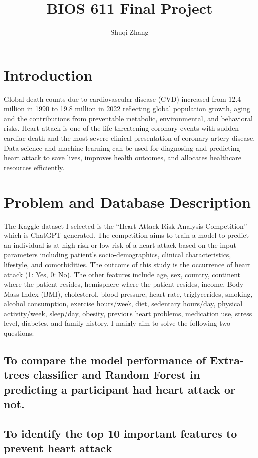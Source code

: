 \documentclass{article}
\title{BIOS 611 Final Project}
\author{Shuqi Zhang}
\begin{document}
\maketitle


\section{Introduction}
Global death counts due to cardiovascular disease (CVD) increased from 12.4 million in 1990 to 19.8 million in 2022 reflecting global population growth, aging and the contributions from preventable metabolic, environmental, and behavioral risks.  Heart attack is one of the life-threatening coronary events with sudden cardiac death and the most severe clinical presentation of coronary artery disease. Data science and machine learning can be used for diagnosing and predicting heart attack to save lives, improves health outcomes, and allocates healthcare resources efficiently. 

\section{Problem and Database Description}
The Kaggle dataset I selected is the “Heart Attack Risk Analysis Competition” which is ChatGPT generated. The competition aims to train a model to predict an individual is at high risk or low risk of a heart attack based on the input parameters including patient’s socio-demographics, clinical characteristics, lifestyle, and comorbidities. The outcome of this study is the occurrence of heart attack (1: Yes, 0: No). The other features include age, sex, country, continent where the patient resides, hemisphere where the patient resides, income, Body Mass Index (BMI), cholesterol, blood pressure, heart rate, triglycerides, smoking, alcohol consumption, exercise hours/week, diet, sedentary hours/day, physical activity/week, sleep/day, obesity, previous heart problems, medication use, stress level, diabetes, and family history. I mainly aim to solve the following two questions:

\subsection{To compare the model performance of Extra-trees classifier and Random Forest in predicting a participant had heart attack or not.}


\subsection{To identify the top 10 important features to prevent heart attack}
\end{document}

